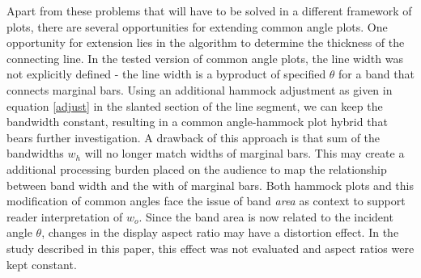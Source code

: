 Apart from these problems that will have to be solved in a different framework of plots, there are several opportunities for extending common angle plots.
One opportunity for extension lies in the algorithm to determine the thickness of the connecting line. In the
tested version of common angle plots, the line width was not explicitly defined - the line width is a byproduct of 
specified $\theta$ for a band that connects marginal bars. Using an additional hammock adjustment as given in equation \ref{adjust} in the slanted section of the line segment, we can keep the bandwidth constant, resulting in a  common angle-hammock plot hybrid that bears further investigation.
A drawback of this approach is that sum of the bandwidths $w_h$ will no longer match widths of marginal bars. 
This may create a additional processing burden placed on the audience to map the relationship between 
band width and the with of marginal bars. 
Both hammock plots and  this modification of common angles face  
the issue of band \emph{area} as context to support reader interpretation of $w_o$. Since the band
area is now related to the incident angle $\theta$, changes in the display aspect ratio may have a distortion 
effect. In the study described in this paper, this effect was not evaluated and aspect ratios were kept constant.



